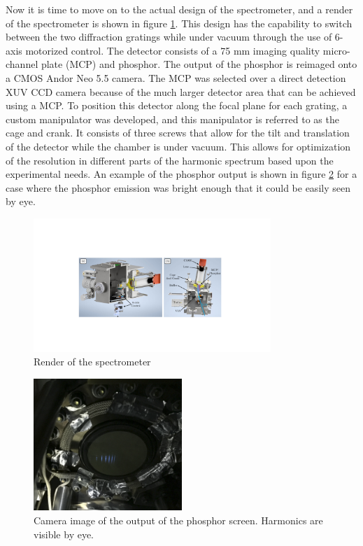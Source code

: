Now it is time to move on to the actual design of the spectrometer, and a render of the spectrometer is shown in figure \ref{fig:CAD_spectrometer}. This design has the capability to switch between the two diffraction gratings while under vacuum through the use of 6-axis motorized control.  The detector consists of a 75 mm imaging quality micro-channel plate (MCP) and phosphor.  The output of the phosphor is reimaged onto a CMOS Andor Neo 5.5 camera.  The MCP was selected over a direct detection XUV CCD camera because of the much larger detector area that can be achieved using a MCP. To position this detector along the focal plane for each grating, a custom manipulator was developed, and this manipulator is referred to as the cage and crank.  It consists of three screws that allow for the tilt and translation of the detector while the chamber is under vacuum.  This allows for optimization of the resolution in different parts of the harmonic spectrum based upon the experimental needs.  An example of the phosphor output is shown in figure \ref{fig:MCP_ts_harmonics} for a case where the phosphor emission was bright enough that it could be easily seen by eye.
\begin{figure}
	\centering
	\includegraphics[width=0.8\textwidth]{figures/Beamline/CAD_spectrometer.pdf}
	\caption[CAD render of the TABLe spectrometer]{Render of the spectrometer}
	\label{fig:CAD_spectrometer}
\end{figure}

\begin{figure}
	\centering
	\includegraphics[width=0.5\textwidth]{figures/Two_source/MCP_ts_harmonics.png}
	\caption[Image of phosphor output of high harmonics generated from two sources]{Camera image of the output of the phosphor screen.  Harmonics are visible by eye.}
	\label{fig:MCP_ts_harmonics}
\end{figure}






